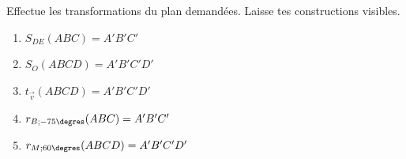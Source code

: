 %
%
    Effectue les transformations du plan demandées. Laisse tes constructions visibles.
    \begin{enumerate}
        \item $S_{DE}(ABC)=A'B'C'$
              \begin{center}
                  
              \end{center}
        \item $S_{O}(ABCD)=A'B'C'D'$
              \begin{center}
                  
              \end{center}
        \item $t_{\overrightarrow{v}}(ABCD)=A'B'C'D'$
              \begin{center}
                  
              \end{center}
              \newpage
        \item $r_{B;-75\degres}(ABC)=A'B'C'$
              \begin{center}
                  
              \end{center}
        \item $r_{M;60\degres}(ABCD)=A'B'C'D'$
              \begin{center}
                  
              \end{center}
    \end{enumerate}

